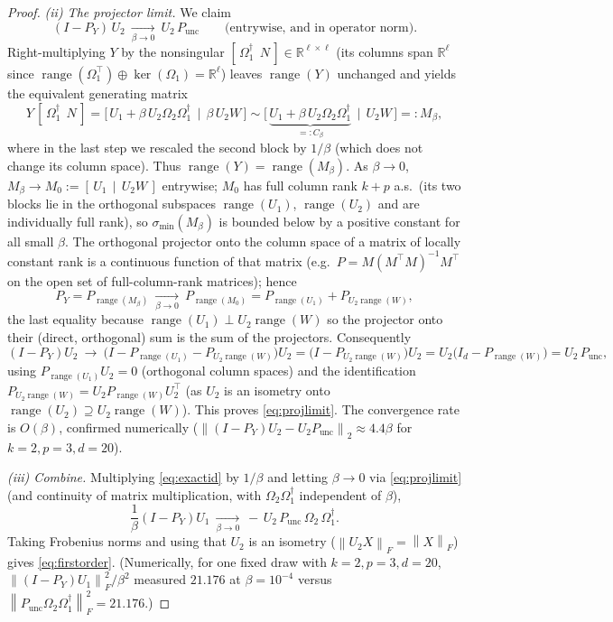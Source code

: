 \documentclass{amsart}
\theoremstyle{definition}
\DeclareMathOperator{\range}{range}
\newcommand{\R}{\mathbb{R}}
\newcommand{\Frob}[1]{\left\lVert #1\right\rVert_F}
\newcommand{\Op}[1]{\left\lVert #1\right\rVert_2}
\begin{document}
\begin{proof}
\emph{(ii) The projector limit.} We claim
\begin{equation}\label{eq:projlimit}
(I-P_Y)\,U_2\ \xrightarrow[\beta\to0]{}\ U_2\,P_{\mathrm{unc}}
\qquad\text{(entrywise, and in operator norm).}
\end{equation}
Right-multiplying $Y$ by the nonsingular $[\,\Omega_1^{\dagger}\ \ N\,]\in\R^{\ell\times\ell}$
(its columns span $\R^\ell$ since $\range(\Omega_1^\top)\oplus\ker(\Omega_1)=\R^\ell$)
leaves $\range(Y)$ unchanged and yields the equivalent generating matrix
\[
Y\,[\,\Omega_1^{\dagger}\ \ N\,]
=\Big[\,U_1+\beta\,U_2\Omega_2\Omega_1^{\dagger}\ \ \big|\ \ \beta\,U_2 W\,\Big]
\sim\Big[\,\underbrace{U_1+\beta\,U_2\Omega_2\Omega_1^{\dagger}}_{=:C_\beta}\ \ \big|\ \ U_2 W\,\Big]=:M_\beta,
\]
where in the last step we rescaled the second block by $1/\beta$ (which does not
change its column space). Thus $\range(Y)=\range(M_\beta)$. As $\beta\to0$,
$M_\beta\to M_0:=[\,U_1\ \ |\ \ U_2W\,]$ entrywise; $M_0$ has full column rank
$k+p$ a.s.\ (its two blocks lie in the orthogonal subspaces $\range(U_1)$,
$\range(U_2)$ and are individually full rank), so $\sigma_{\min}(M_\beta)$ is
bounded below by a positive constant for all small $\beta$. The orthogonal
projector onto the column space of a matrix of locally constant rank is a
continuous function of that matrix (e.g.\ $P=M(M^\top M)^{-1}M^\top$ on the open
set of full-column-rank matrices); hence
\[
P_Y=P_{\range(M_\beta)}\ \xrightarrow[\beta\to0]{}\ P_{\range(M_0)}
=P_{\range(U_1)}+P_{U_2\range(W)},
\]
the last equality because $\range(U_1)\perp U_2\range(W)$ so the projector onto
their (direct, orthogonal) sum is the sum of the projectors. Consequently
\[
(I-P_Y)U_2\ \to\ \big(I-P_{\range(U_1)}-P_{U_2\range(W)}\big)U_2
=\big(I-P_{U_2\range(W)}\big)U_2
=U_2\big(I_d-P_{\range(W)}\big)=U_2\,P_{\mathrm{unc}},
\]
using $P_{\range(U_1)}U_2=0$ (orthogonal column spaces) and the identification
$P_{U_2\range(W)}=U_2 P_{\range(W)}U_2^\top$ (as $U_2$ is an isometry onto
$\range(U_2)\supseteq U_2\range(W)$). This proves \eqref{eq:projlimit}.
The convergence rate is $O(\beta)$, confirmed numerically
($\Op{(I-P_Y)U_2-U_2P_{\mathrm{unc}}}\approx4.4\beta$ for $k=2,p=3,d=20$).

\emph{(iii) Combine.} Multiplying \eqref{eq:exactid} by $1/\beta$ and letting
$\beta\to0$ via \eqref{eq:projlimit} (and continuity of matrix multiplication,
with $\Omega_2\Omega_1^{\dagger}$ independent of $\beta$),
\[
\frac1\beta(I-P_Y)U_1\ \xrightarrow[\beta\to0]{}\ -\,U_2\,P_{\mathrm{unc}}\,\Omega_2\,\Omega_1^{\dagger}.
\]
Taking Frobenius norms and using that $U_2$ is an isometry
($\Frob{U_2 X}=\Frob{X}$) gives \eqref{eq:firstorder}. (Numerically, for one
fixed draw with $k=2,p=3,d=20$, $\Frob{(I-P_Y)U_1}^2/\beta^2$ measured
$21.176$ at $\beta=10^{-4}$ versus $\Frob{P_{\mathrm{unc}}\Omega_2\Omega_1^\dagger}^2=21.176$.)


\end{proof}
\end{document}
